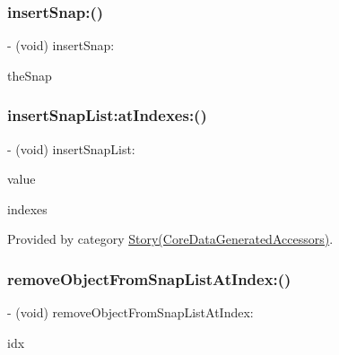 \subsubsection{\texorpdfstring{insert\+Snap\+:()}{insertSnap:()}}
{\footnotesize\ttfamily -\/ (void) insert\+Snap\+: \begin{DoxyParamCaption}\item[{(\hyperlink{interface_snap}{Snap} $\ast$)}]{the\+Snap }\end{DoxyParamCaption}}

\hypertarget{interface_story_a84a4bc73fd231a323da10244fa876157}{}\label{interface_story_a84a4bc73fd231a323da10244fa876157} 
\subsubsection{\texorpdfstring{insert\+Snap\+List\+:at\+Indexes\+:()}{insertSnapList:atIndexes:()}}
{\footnotesize\ttfamily -\/ (void) insert\+Snap\+List\+: \begin{DoxyParamCaption}\item[{(N\+S\+Array$<$ \hyperlink{interface_snap}{Snap} $\ast$ $>$ $\ast$)}]{value }\item[{atIndexes:(N\+S\+Index\+Set $\ast$)}]{indexes }\end{DoxyParamCaption}}



Provided by category \hyperlink{category_story_07_core_data_generated_accessors_08_a84a4bc73fd231a323da10244fa876157}{Story(\+Core\+Data\+Generated\+Accessors)}.

\hypertarget{interface_story_a2862a1453b5d1ec4410421feed5acfdd}{}\label{interface_story_a2862a1453b5d1ec4410421feed5acfdd} 
\subsubsection{\texorpdfstring{remove\+Object\+From\+Snap\+List\+At\+Index\+:()}{removeObjectFromSnapListAtIndex:()}}
{\footnotesize\ttfamily -\/ (void) remove\+Object\+From\+Snap\+List\+At\+Index\+: \begin{DoxyParamCaption}\item[{(N\+S\+U\+Integer)}]{idx }\end{DoxyParamCaption}}



